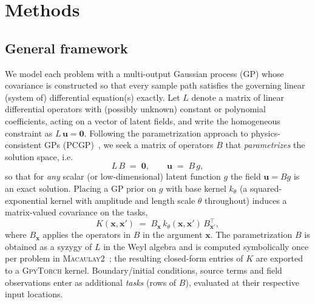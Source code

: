 
\section{Methods}
\label{sec:methods}

\subsection{General framework}
\label{sec:framework}

We model each problem with a multi-output Gaussian process (GP) whose
covariance is constructed so that every sample path satisfies the
governing linear (system of) differential equation(s) exactly.  Let
$L$ denote a matrix of linear differential operators with
(possibly unknown) constant or polynomial coefficients, acting on a
vector of latent fields, and write the homogeneous constraint as
$L\,\bm{u}=\bm{0}$.  Following the parametrization approach to
physics-consistent GPs (PCGP)~\cite{XXX_PCGP}, we seek a matrix of
operators $B$ that \emph{parametrizes} the solution space, i.e.
\begin{equation}
  L\,B \;=\; \bm{0},
  \qquad
  \bm{u} \;=\; B\,g ,
  \label{eq:parametrization}
\end{equation}
so that for \emph{any} scalar (or low-dimensional) latent function $g$
the field $\bm{u}=Bg$ is an exact solution.  Placing a GP prior on $g$
with base kernel $k_\theta$ (a squared-exponential kernel with
amplitude and length scale $\theta$ throughout) induces a matrix-valued
covariance on the tasks,
\begin{equation}
  K(\bm{x},\bm{x}')
  \;=\;
  B_{\bm{x}}\,k_\theta(\bm{x},\bm{x}')\,B_{\bm{x}'}^{\!\top},
  \label{eq:matrix-kernel}
\end{equation}
where $B_{\bm{x}}$ applies the operators in $B$ in the argument $\bm{x}$.
The parametrization $B$ is obtained as a syzygy of $L$ in the Weyl
algebra and is computed symbolically once per problem in
\textsc{Macaulay2}~\cite{XXX_M2}; the resulting closed-form entries of
$K$ are exported to a \textsc{GpyTorch} kernel.  Boundary/initial
conditions, source terms and field observations enter as additional
\emph{tasks} (rows of $B$), evaluated at their respective input
locations.

